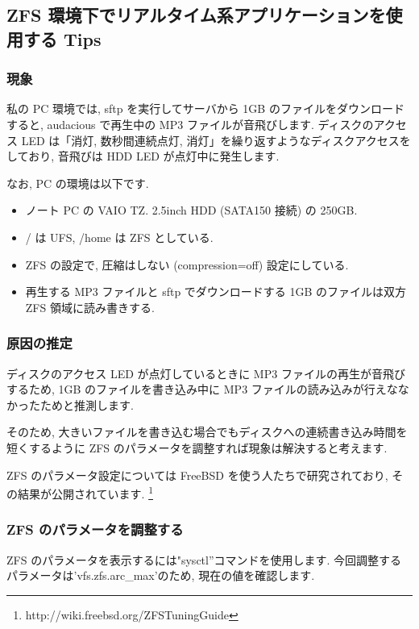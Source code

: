 \documentclass[mingoth,a4paper]{jsarticle}
\begin{document}
\subsection{ZFS 環境下でリアルタイム系アプリケーションを使用する Tips}
\subsubsection{現象}
私の PC 環境では, sftp を実行してサーバから 1GB のファイルをダウンロードすると, audacious で再生中の MP3 ファイルが音飛びします. ディスクのアクセス LED は「消灯, 数秒間連続点灯, 消灯」を繰り返すようなディスクアクセスをしており, 音飛びは HDD LED が点灯中に発生します.

なお, PC の環境は以下です.

\begin{itemize}
  \item ノート PC の VAIO TZ. 2.5inch HDD (SATA150 接続) の 250GB.
  \item / は UFS, /home は ZFS としている.
  \item ZFS の設定で, 圧縮はしない (compression=off) 設定にしている.
  \item 再生する MP3 ファイルと sftp でダウンロードする 1GB のファイルは双方 ZFS 領域に読み書きする.
\end{itemize}

\subsubsection{原因の推定}
ディスクのアクセス LED が点灯しているときに MP3 ファイルの再生が音飛びするため, 1GB のファイルを書き込み中に MP3 ファイルの読み込みが行えななかったためと推測します.

そのため, 大きいファイルを書き込む場合でもディスクへの連続書き込み時間を短くするように ZFS のパラメータを調整すれば現象は解決すると考えます.

ZFS のパラメータ設定については FreeBSD を使う人たちで研究されており, その結果が公開されています. \footnote{http://wiki.freebsd.org/ZFSTuningGuide}

\subsubsection{ZFS のパラメータを調整する}
ZFS のパラメータを表示するには"sysctl''コマンドを使用します.
今回調整するパラメータは'vfs.zfs.arc\_max'のため, 現在の値を確認します.

\end{document}
